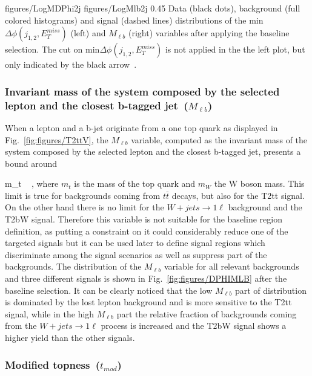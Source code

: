                  {figures/LogMDPhi2j} %
                 {figures/LogMlb2j} %
                 {0.45}       %
                 { Data (black dots), background (full colored histograms) and signal (dashed lines) distributions of the min$\Delta \phi (j_{1,2}, E_{T}^{miss})$ (left) and $M_{\ell b}$ (right) variables after applying the baseline selection. The cut on min$\Delta \phi (j_{1,2}, E_{T}^{miss})$  is not applied in the the left plot, but only indicated by the black arrow~\cite{website:stopSupp}. }

\subsubsection{Invariant mass of the system composed by the selected lepton and the closest b-tagged jet~($M_{\ell b}$)}

When a lepton and a b-jet originate from a one top quark as displayed in Fig.~\ref{fig:figures/T2ttV}, the $M_{\ell b}$ variable, computed as the invariant mass of the system composed by the selected lepton and the closest b-tagged jet, presents a bound around

{
 m_{t}  ~ ,
}
where $m_{t}$ is the mass of the top quark and $m_{W}$ the W boson mass. This limit is true for backgrounds coming from $t\bar{t}$ decays, but also for the T2tt signal. On the other hand there is no limit for the $W+jets \to 1\ell$  background and the T2bW signal. Therefore this variable is not suitable for the baseline region definition, as putting a constraint on it could considerably reduce one of the targeted signals but it can be used later to define signal regions which discriminate among the signal scenarios as well as suppress part of the backgrounds. The distribution of the  $M_{\ell b}$ variable for all relevant backgrounds and three different signals is shown in Fig.~\ref{fig:figures/DPHIMLB} after the baseline selection. It can be clearly noticed that the low $M_{\ell b}$ part of distribution is dominated by the lost lepton background and is more sensitive to the T2tt signal, while in  the high $M_{\ell b}$ part the relative fraction of backgrounds coming from the $W+jets \to 1\ell$ process is increased and the T2bW  signal shows a higher yield than the other signals.

\subsubsection{Modified topness~($t_{mod}$)}

